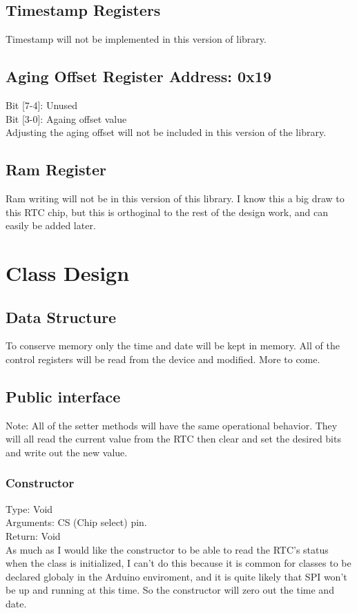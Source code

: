 \documentclass[letterpaper,11pt]{article}
\newcommand{\address}[1]
{\textbf{Address: 0x#1}}
\begin{document}
	\subsection{Timestamp Registers}
		Timestamp will not be implemented in this version of library.
	\subsection{Aging Offset Register \address{19}}
		Bit [7-4]: Unused\\
		Bit [3-0]: Againg offset value\\
		Adjusting the aging offset will not be included in this version of the library.
	\subsection{Ram Register}
		Ram writing will not be in this version of this library. I know this a big draw to this RTC chip, but this is orthoginal to the rest of the design work, and can easily be added later.

\section{Class Design}
	\subsection{Data Structure}
		To conserve memory only the time and date will be kept in memory. All of the control registers will be read from the device and modified. More to come.
	\subsection{Public interface}
		Note: All of the setter methods will have the same operational behavior. They will all read the current value from the RTC then clear and set the desired bits and write out the new value.
		\subsubsection{Constructor}
		Type: Void\\
		Arguments: CS (Chip select) pin.\\
		Return: Void\\
		As much as I would like the constructor to be able to read the RTC's status when the class is initialized, I can't do this because it is common for classes to be declared globaly in the Arduino enviroment, and it is quite likely that SPI won't be up and running at this time. So the constructor will zero out the time and date.\\
\end{document}
